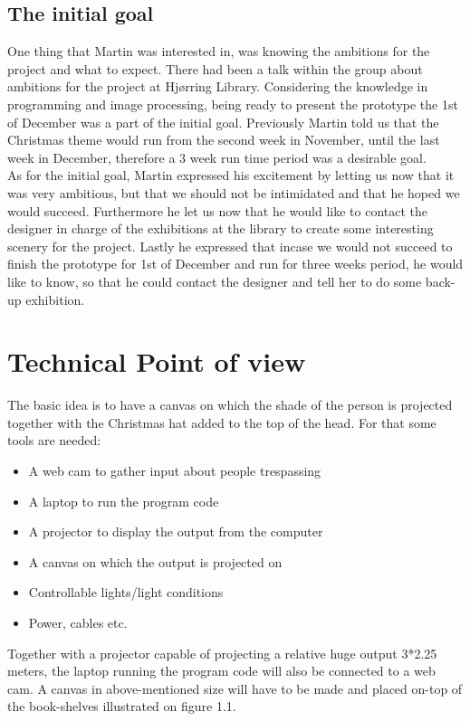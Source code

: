 \subsection{The initial goal}
One thing that Martin was interested in, was knowing the ambitions for the project and what to expect. There had been a talk within the group about ambitions for the project at Hjørring Library. Considering the knowledge in programming and image processing, being ready to present the prototype the 1st of December was a part of the initial goal. Previously Martin told us that the Christmas theme would run from the second week in November, until the last week in December, therefore a 3 week run time period was a desirable goal.\\
As for the initial goal, Martin expressed his excitement by letting us now that it was very ambitious, but that we should not be intimidated and that he hoped we would succeed. Furthermore he let us now that he would like to contact the designer in charge of the exhibitions at the library to create some interesting scenery for the project. Lastly he expressed that incase we would not succeed to finish the prototype for 1st of December and run for three weeks period, he would like to know, so that he could contact the designer and tell her to do some back-up exhibition.


\section{Technical Point of view}
The basic idea is to have a canvas on which the shade of the person is projected together with the Christmas hat added to the top of the head. For that some tools are needed:

\begin{itemize}
\item A web cam to gather input about people trespassing
\item A laptop to run the program code
\item A projector to display the output from the computer
\item A canvas on which the output is projected on
\item Controllable lights/light conditions
\item Power, cables etc.
\end{itemize}

Together with a projector capable of projecting a relative huge output 3*2.25 meters, the laptop running the program code will also be connected to a web cam. A canvas in above-mentioned size will have to be made and placed on-top of the book-shelves illustrated on figure 1.1. 

